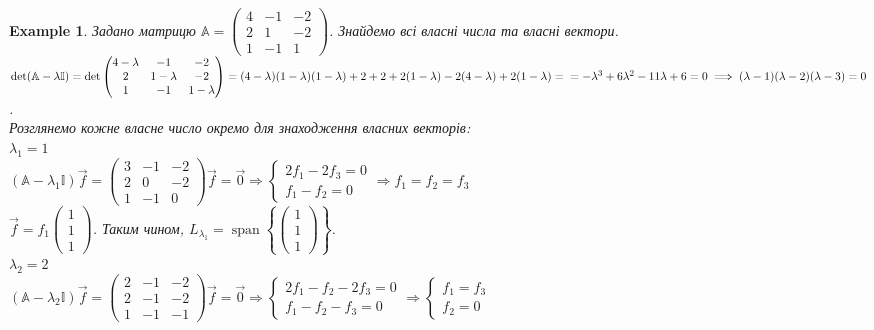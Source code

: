 \documentclass[a4paper, 10pt]{article}
\theoremstyle{theoremdd}
\newtheorem{example}[theorem]{Example}
\DeclareMathOperator{\linspan}{span}
\begin{document}
\begin{example}
\label{find_eigenvectors}
Задано матрицю $\mathbb{A} = \begin{pmatrix}
4 & -1 & -2 \\
2 & 1 & -2 \\
1 & -1 & 1
\end{pmatrix}$. Знайдемо всі власні числа та власні вектори.\\
$\det (\mathbb{A} - \lambda \mathbb{I}) = \det \begin{pmatrix}
4-\lambda & -1 & -2 \\
2 & 1-\lambda & -2 \\
1 & -1 & 1-\lambda
\end{pmatrix} = (4-\lambda)(1-\lambda)(1-\lambda) + 2 + 2 + 2(1-\lambda) -2(4-\lambda) +2(1-\lambda) = \\ = -\lambda^3 + 6 \lambda^2 - 11 \lambda + 6 = 0 \implies (\lambda - 1)(\lambda -2)(\lambda - 3) = 0$.\\
Розглянемо кожне власне число окремо для знаходження власних векторів:\\
$\lambda_1 = 1$\\
$(\mathbb{A} - \lambda_1 \mathbb{I})\vec{f} =\begin{pmatrix}
3 & -1 & -2 \\
2 & 0 & -2 \\
1 & -1 & 0
\end{pmatrix} \vec{f} = \vec{0} \Rightarrow \begin{cases} 2f_1 - 2f_3 = 0 \\ f_1 - f_2 = 0 \end{cases} \Rightarrow f_1 = f_2 = f_3$\\
$\vec{f} = f_1 \begin{pmatrix}
1 \\ 1 \\ 1
\end{pmatrix}$. Таким чином, $L_{\lambda_1} = \linspan\left\{ \begin{pmatrix}
1 \\ 1 \\ 1
\end{pmatrix} \right\}$.
\bigskip \\
$\lambda_2 = 2$\\
$(\mathbb{A} - \lambda_2 \mathbb{I})\vec{f} =\begin{pmatrix}
2 & -1 & -2 \\
2 & -1 & -2 \\
1 & -1 & -1
\end{pmatrix} \vec{f} = \vec{0} \Rightarrow \begin{cases} 2f_1 - f_2 - 2f_3 = 0 \\ f_1 - f_2 - f_3 = 0 \end{cases} \Rightarrow \begin{cases} f_1 = f_3 \\ f_2 = 0 \end{cases}$\\

\end{example}
\end{document}
